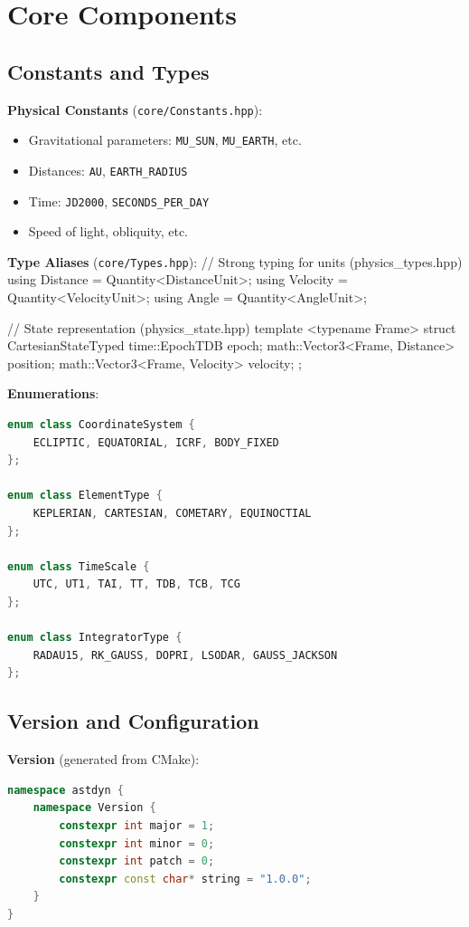 \section{Core Components}

\subsection{Constants and Types}

\textbf{Physical Constants} (\texttt{core/Constants.hpp}):
\begin{itemize}
    \item Gravitational parameters: \texttt{MU\_SUN}, \texttt{MU\_EARTH}, etc.
    \item Distances: \texttt{AU}, \texttt{EARTH\_RADIUS}
    \item Time: \texttt{JD2000}, \texttt{SECONDS\_PER\_DAY}
    \item Speed of light, obliquity, etc.
\end{itemize}

\textbf{Type Aliases} (\texttt{core/Types.hpp}):
// Strong typing for units (physics\_types.hpp)
using Distance = Quantity<DistanceUnit>;
using Velocity = Quantity<VelocityUnit>;
using Angle    = Quantity<AngleUnit>;

// State representation (physics\_state.hpp)
template <typename Frame>
struct CartesianStateTyped {
    time::EpochTDB epoch;
    math::Vector3<Frame, Distance> position;
    math::Vector3<Frame, Velocity> velocity;
};

\textbf{Enumerations}:
\begin{lstlisting}[language=C++]
enum class CoordinateSystem {
    ECLIPTIC, EQUATORIAL, ICRF, BODY_FIXED
};

enum class ElementType {
    KEPLERIAN, CARTESIAN, COMETARY, EQUINOCTIAL
};

enum class TimeScale {
    UTC, UT1, TAI, TT, TDB, TCB, TCG
};

enum class IntegratorType {
    RADAU15, RK_GAUSS, DOPRI, LSODAR, GAUSS_JACKSON
};
\end{lstlisting}

\subsection{Version and Configuration}

\textbf{Version} (generated from CMake):
\begin{lstlisting}[language=C++]
namespace astdyn {
    namespace Version {
        constexpr int major = 1;
        constexpr int minor = 0;
        constexpr int patch = 0;
        constexpr const char* string = "1.0.0";
    }
}
\end{lstlisting}

